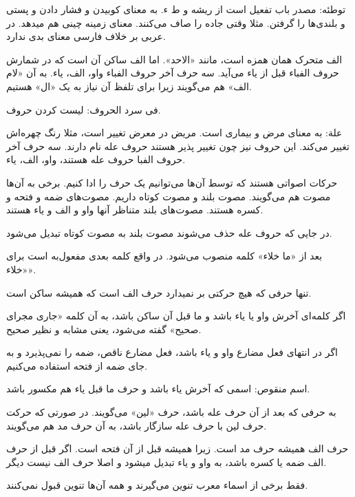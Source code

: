 \documentclass{article}
\begin{document}
\begin{addpage}{2}
  \vspace*{0.3cm}
  \begin{note}
    توطئه: مصدر باب تفعیل است از ریشه و ط ء.
    به معنای کوبیدن و فشار دادن و پستی و بلندی‌ها را گرفتن. مثلا وقتی جاده را صاف می‌کنند. معنای زمینه چینی هم میدهد. در عربی بر خلاف فارسی معنای بدی ندارد.
  \end{note}
  \begin{note}
    الف متحرک همان همزه است، مانند «الاحد». اما الف ساکن آن است که در شمارش حروف الفباء قبل از یاء می‌آید. سه حرف آخر حروف الفباء
    واو، الف، یاء. به آن «لام الف» هم می‌گویند زیرا برای تلفظ آن نیاز به یک «ال» هستیم.
  \end{note}
  \begin{note}
    فی سرد الحروف: لیست کردن حروف.
  \end{note}
  \begin{note}
    علة: به معنای مرض و بیماری است. مریض در معرض تغییر است، مثلا رنگ چهره‌اش تغییر می‌کند. این حروف نیز چون تغییر پذیر هستند حروف عله نام دارند.
    سه حرف آخر حروف الفبا حروف عله هستند، واو، الف، یاء.
  \end{note}
  \begin{note}
    حرکات اصواتی هستند که توسط آن‌ها می‌توانیم یک حرف را ادا کنیم. برخی به آن‌ها مصوت هم می‌گویند. مصوت بلند و مصوت کوتاه داریم. مصوت‌های ضمه و فتحه و کسره هستند.
    مصوت‌های بلند متناظر آنها واو و الف و یاء هستند.

    در جایی که حروف عله حذف می‌شوند مصوت بلند به مصوت کوتاه تبدیل می‌شود.
  \end{note}
  \begin{note}
    بعد از «ما خلاء» کلمه منصوب می‌شود. در واقع کلمه بعدی مفعول‌به است برای «خلاء».
    
    تنها حرفی که هیچ حرکتی بر نمیدارد حرف الف است که همیشه ساکن است.
  \end{note}
  \begin{note}
    اگر کلمه‌ای آخرش واو یا یاء باشد و ما قبل آن ساکن باشد، به آن کلمه «جاری مجرای صحیح» گفته می‌شود، یعنی مشابه و نظیر صحیح.

    اگر در انتهای فعل مضارع واو و یاء باشد، فعل مضارع ناقص، ضمه را نمی‌پذیرد و به جای ضمه از فتحه استفاده می‌کنیم.

    اسم منقوص: اسمی که آخرش یاء باشد و حرف ما قبل یاء هم مکسور باشد.
  \end{note}
  \begin{note}
    به حرفی که بعد از آن حرف عله باشد، حرف «لین» می‌گویند. در صورتی که حرکت حرف لین با حرف عله سازگار باشد، به آن حرف مد هم می‌گویند.
  \end{note}
  \begin{note}
    حرف الف همیشه حرف مد است. زیرا همیشه قبل از آن فتحه است. اگر قبل از حرف الف ضمه یا کسره باشد، به واو و یاء تبدیل میشود و اصلا حرف الف نیست دیگر.
  \end{note}
  \vspace*{2cm}
  \begin{note}
    فقط برخی از اسماء معرب تنوین می‌گیرند و همه آن‌ها تنوین قبول نمی‌کنند.
  \end{note}
\end{addpage}
\end{document}
